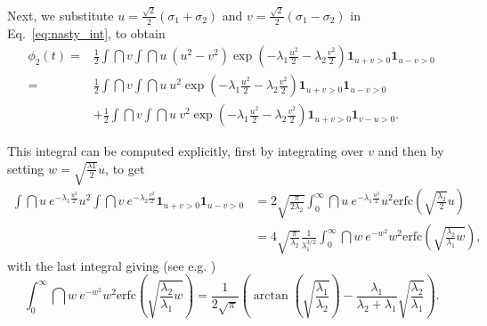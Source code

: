 Next, we substitute $u=\frac{\sqrt{2}}{2}\left(\sigma_1+\sigma_2\right)$ and $v=\frac{\sqrt{2}}{2}\left(\sigma_1-\sigma_2\right)$ in Eq.~\eqref{eq:nasty_int}, to obtain
\begin{equation}
\begin{split}
\phi_2(t) =& \frac{1}{2}\int\dint v \int \dint u ~\left(u^2-v^2\right)\exp\left(-\lambda_1\frac{u^2}{2}-\lambda_2\frac{v^2}{2}\right)\mathbf{1}_{u+v>0}\mathbf{1}_{u-v>0} \\
=& \frac{1}{2}\int\dint v \int \dint u~u^2 \exp\left(-\lambda_1\frac{u^2}{2}-\lambda_2\frac{v^2}{2}\right)\mathbf{1}_{u+v>0}\mathbf{1}_{u-v>0}\\
&+ \frac{1}{2}\int\dint v \int \dint u~v^2 \exp\left(-\lambda_1\frac{u^2}{2}-\lambda_2\frac{v^2}{2}\right)\mathbf{1}_{u+v>0}\mathbf{1}_{v-u>0}.
\end{split}
\end{equation}


This integral can be computed explicitly, first by integrating over $v$ and then by setting $w=\sqrt{\frac{\lambda 1}{2}}u$, to get
\begin{equation}\label{eq:nasty_1}
\begin{split}
\int \dint u~e^{-\lambda_1 \frac{u^2}{2}}u^2 \int\dint v~ e^{-\lambda_2 \frac{v^2 }{2}}\mathbf{1}_{u+v>0}\mathbf{1}_{u-v>0} &= 2\sqrt{\frac{\pi}{2\lambda_2}} \int_{0}^{\infty}\dint u~e^{-\lambda_1 \frac{u^2}{2}}u^2 \text{erfc}\left(\sqrt{\frac{\lambda_2}{2}}u\right)\\
&= 4\sqrt{\frac{\pi}{\lambda_2}}\frac{1}{\lambda_1^{3/2}}\int_{0}^{\infty}\dint w~e^{-w^2}w^2 \text{erfc}\left(\sqrt{\frac{\lambda_2}{\lambda_1} w} \right),
\end{split}
\end{equation}
with the last integral giving (see e.g. \cite{Ng_Geller_1969})
\begin{equation}
    \int_{0}^{\infty}\dint w~e^{-w^2}w^2 \text{erfc}\left(\sqrt{\frac{\lambda_2}{\lambda_1} w} \right) = \frac{1}{2\sqrt{\pi}}\left(\arctan\left(\sqrt{\frac{\lambda_1}{\lambda_2}}\right)- \frac{\lambda_1}{\lambda_2+\lambda_1}\sqrt{\frac{\lambda_2}{\lambda_1}}\right).
\end{equation}


